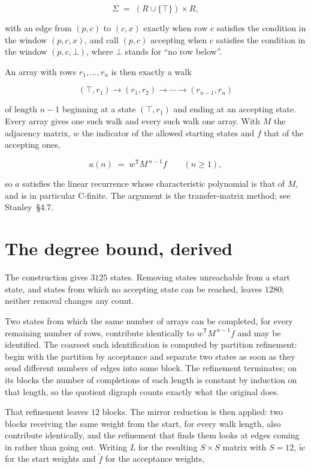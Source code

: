 \documentclass[11pt]{article}
\theoremstyle{definition}
\begin{document}
\[\Sigma \;=\; (R \cup \{\top\}) \times R,\]

with an edge from $(p,c)$ to $(c,x)$ exactly when row $c$ satisfies the condition in the window $(p,c,x)$, and call $(p,c)$ accepting when $c$ satisfies the condition in the window $(p,c,\bot)$, where $\bot$ stands for ``no row below''.

An array with rows $r_1,\dots,r_n$ is then exactly a walk

\[(\top,r_1) \to (r_1,r_2) \to \cdots \to (r_{n-1},r_n)\]

of length $n-1$ beginning at a state $(\top,r_1)$ and ending at an accepting state. Every array gives one such walk and every such walk one array. With $M$ the adjacency matrix, $w$ the indicator of the allowed starting states and $f$ that of the accepting ones,

\[a(n) \;=\; w^{\mathsf T} M^{\,n-1} f \qquad (n \ge 1),\]

so $a$ satisfies the linear recurrence whose characteristic polynomial is that of $M$, and is in particular C-finite. The argument is the transfer-matrix method; see Stanley~\S4.7.

\section{The degree bound, derived}

The construction gives $3125$ states. Removing states unreachable from a start state, and states from which no accepting state can be reached, leaves $1280$; neither removal changes any count.

Two states from which the same number of arrays can be completed, for every remaining number of rows, contribute identically to $w^{\mathsf T}M^{\,n-1}f$ and may be identified. The coarsest such identification is computed by partition refinement: begin with the partition by acceptance and separate two states as soon as they send different numbers of edges into some block. The refinement terminates; on its blocks the number of completions of each length is constant by induction on that length, so the quotient digraph counts exactly what the original does.

That refinement leaves $12$ blocks. The mirror reduction is then applied: two blocks receiving the same weight from the start, for every walk length, also contribute identically, and the refinement that finds them looks at edges coming in rather than going out. Writing $L$ for the resulting $S \times S$ matrix with $S = 12$, $\tilde w$ for the start weights and $\tilde f$ for the acceptance weights,
\end{document}
